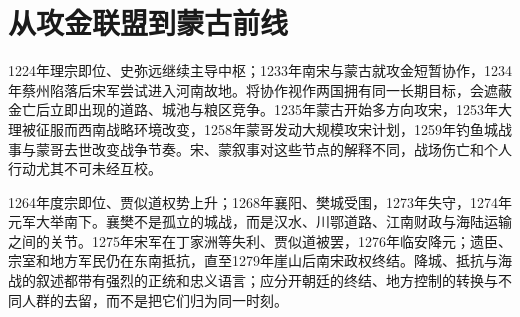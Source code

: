 \section{从攻金联盟到蒙古前线}

1224年理宗即位、史弥远继续主导中枢；1233年南宋与蒙古就攻金短暂协作，1234年蔡州陷落后宋军尝试进入河南故地。将协作视作两国拥有同一长期目标，会遮蔽金亡后立即出现的道路、城池与粮区竞争。1235年蒙古开始多方向攻宋，1253年大理被征服而西南战略环境改变，1258年蒙哥发动大规模攻宋计划，1259年钓鱼城战事与蒙哥去世改变战争节奏。宋、蒙叙事对这些节点的解释不同，战场伤亡和个人行动尤其不可未经互校。

1264年度宗即位、贾似道权势上升；1268年襄阳、樊城受围，1273年失守，1274年元军大举南下。襄樊不是孤立的城战，而是汉水、川鄂道路、江南财政与海陆运输之间的关节。1275年宋军在丁家洲等失利、贾似道被罢，1276年临安降元；遗臣、宗室和地方军民仍在东南抵抗，直至1279年崖山后南宋政权终结。降城、抵抗与海战的叙述都带有强烈的正统和忠义语言；应分开朝廷的终结、地方控制的转换与不同人群的去留，而不是把它们归为同一时刻。




